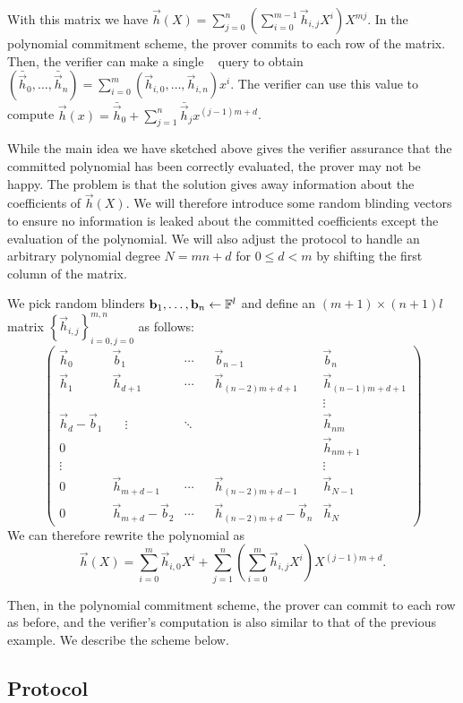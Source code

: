 With this matrix we have $\vec{h}(X)=\sum_{j=0}^n(\sum_{i=0}^{m-1}\vec{h}_{i,j}X^i)X^{mj}$. In the polynomial commitment scheme, the prover commits to each row of the matrix. Then, the verifier can make a single \ILC~ query to obtain $(\bar{\vec{h}}_0,\ldots,\bar{\vec{h}}_n) = \sum_{i=0}^{m} (\vec{h}_{i,0},\ldots,\vec{h}_{i,n}) x^i$. The verifier can use this value to compute $\vec{h}(x) = \bar{\vec{h}}_0+\sum_{j=1}^{n} \bar{\vec{h}}_{j} x^{(j-1)m+d}$.

While the main idea we have sketched above gives the verifier assurance that the committed polynomial has been correctly evaluated, the prover may not be happy. The problem is that the solution gives away information about the coefficients of $\vec{h}(X)$. We will therefore introduce some random blinding vectors to ensure no information is leaked about the committed coefficients except the evaluation of the polynomial. We will also adjust the protocol to handle an arbitrary polynomial degree $N=mn+d$ for $0\leq d<m$ by shifting the first column of the matrix.

We pick random blinders $\mathbf{b}_1,\ldots,\mathbf{b}_n\gets \mathbb{F}^l$ and define an $(m+1)\times (n+1)l$ matrix $\left\{ \vec{h}_{i,j} \right\}_{i=0,j=0}^{m,n}$ as follows:
$$\left(\begin{array}{lllll}
\vec{h}_0 & \vec{b}_{1} & \cdots & \vec{b}_{n-1} & \vec{b}_n \\
\vec{h}_1 & \vec{h}_{d+1} & \cdots & \vec{h}_{(n-2)m+d+1} & \vec{h}_{(n-1)m+d+1}\\
&&&& \vdots \\
\vec{h}_d-\vec{b}_1 & \quad \vdots & \ddots \quad & & \vec{h}_{nm}\\
0 &&&& \vec{h}_{nm+1}\\
\vdots &&&& \vdots  \\
0 & \vec{h}_{m+d-1}  & \cdots  & \vec{h}_{(n-2)m+d-1} & \vec{h}_{N-1} \\
0 & \vec{h}_{m+d}-\vec{b}_2 & \cdots & \vec{h}_{(n-2)m+d}-\vec{b}_n & \vec{h}_{N}
\end{array} \right)$$
We can therefore rewrite the polynomial as $$\vec{h}(X)=\sum_{i=0}^m\vec{h}_{i,0}X^i +\sum_{j=1}^{n} \left(\sum_{i=0}^m\vec{h}_{i,j}X^i \right)X^{(j-1)m+d}.$$

Then, in the polynomial commitment scheme, the prover can commit to each row as before, and the verifier's computation is also similar to that of the previous example. We describe the scheme below.

\subsection{Protocol}

